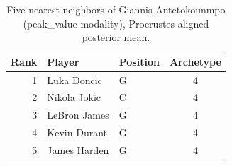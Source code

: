 \begin{table}[htbp]
  \centering\small
  \begin{tabular}{rllc}
    \toprule
    Rank & Player & Position & Archetype \\
    \midrule
    1 & Luka Doncic & G & 4 \\
    2 & Nikola Jokic & C & 4 \\
    3 & LeBron James & G & 4 \\
    4 & Kevin Durant & G & 4 \\
    5 & James Harden & G & 4 \\
    \bottomrule
  \end{tabular}
  \caption{Five nearest neighbors of Giannis Antetokounmpo (peak_value modality), Procrustes-aligned posterior mean.}
  \label{tab:Giannis_Antetokounmpo_neighbors_peak_value}
\end{table}

